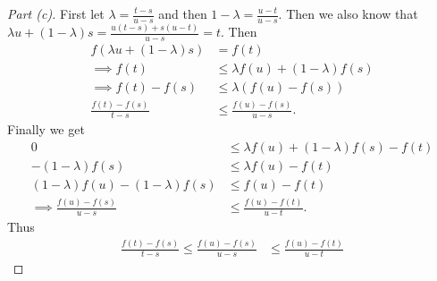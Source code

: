 \documentclass[leqno]{article}
\theoremstyle{nonumberplain}
\newtheorem{proof}{Proof}
\begin{document}
\begin{proof}[Part (c)]
First let $\lambda = \frac{t-s}{u-s}$ and then $1-\lambda=\frac{u-t}{u-s}$.  Then we also know that $\lambda u + (1-\lambda)s=\frac{u(t-s)+s(u-t)}{u-s}=t$.  Then
\begin{align*}
f(\lambda u + (1-\lambda)s)&=f(t)\\
\implies f(t)&\leq \lambda f(u)+(1-\lambda)f(s)\\
\implies f(t)-f(s)&\leq \lambda (f(u)-f(s))\\
\frac{f(t)-f(s)}{t-s}&\leq \frac{f(u)-f(s)}{u-s}.
\end{align*}
Finally we get
\begin{align*}
0&\leq \lambda f(u)+(1-\lambda)f(s)-f(t)\\
-(1-\lambda)f(s) &\leq \lambda f(u)-f(t)\\
(1-\lambda)f(u)-(1-\lambda)f(s)&\leq f(u)-f(t)\\
\implies \frac{f(u)-f(s)}{u-s}&\leq \frac{f(u)-f(t)}{u-t}.
\end{align*}
Thus
\begin{align*}
\frac{f(t)-f(s)}{t-s} \leq \frac{f(u)-f(s)}{u-s}&\leq \frac{f(u)-f(t)}{u-t}
\end{align*}
\end{proof}

\pagebreak
\end{document}
